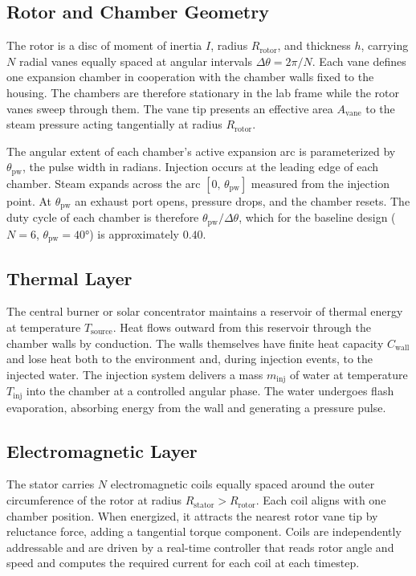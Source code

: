 \documentclass[11pt, a4paper]{article}
\theoremstyle{plain}
\theoremstyle{definition}
\newcommand{\Tsource}{T_{\mathrm{source}}}
\newcommand{\Tinject}{T_{\mathrm{inj}}}
\newcommand{\Nch}{N}
\begin{document}
\subsection{Rotor and Chamber Geometry}

The rotor is a disc of moment of inertia $I$, radius $R_{\mathrm{rotor}}$, and thickness $h$, carrying $\Nch$ radial vanes equally spaced at angular intervals $\Delta\theta = 2\pi / \Nch$. Each vane defines one expansion chamber in cooperation with the chamber walls fixed to the housing. The chambers are therefore stationary in the lab frame while the rotor vanes sweep through them. The vane tip presents an effective area $A_{\mathrm{vane}}$ to the steam pressure acting tangentially at radius $R_{\mathrm{rotor}}$.

The angular extent of each chamber's active expansion arc is parameterized by $\theta_{\mathrm{pw}}$, the pulse width in radians. Injection occurs at the leading edge of each chamber. Steam expands across the arc $[0,\, \theta_{\mathrm{pw}}]$ measured from the injection point. At $\theta_{\mathrm{pw}}$ an exhaust port opens, pressure drops, and the chamber resets. The duty cycle of each chamber is therefore $\theta_{\mathrm{pw}} / \Delta\theta$, which for the baseline design ($\Nch = 6$, $\theta_{\mathrm{pw}} = 40°$) is approximately $0.40$.

\subsection{Thermal Layer}

The central burner or solar concentrator maintains a reservoir of thermal energy at temperature $\Tsource$. Heat flows outward from this reservoir through the chamber walls by conduction. The walls themselves have finite heat capacity $C_{\mathrm{wall}}$ and lose heat both to the environment and, during injection events, to the injected water. The injection system delivers a mass $m_{\mathrm{inj}}$ of water at temperature $\Tinject$ into the chamber at a controlled angular phase. The water undergoes flash evaporation, absorbing energy from the wall and generating a pressure pulse.

\subsection{Electromagnetic Layer}

The stator carries $\Nch$ electromagnetic coils equally spaced around the outer circumference of the rotor at radius $R_{\mathrm{stator}} > R_{\mathrm{rotor}}$. Each coil aligns with one chamber position. When energized, it attracts the nearest rotor vane tip by reluctance force, adding a tangential torque component. Coils are independently addressable and are driven by a real-time controller that reads rotor angle and speed and computes the required current for each coil at each timestep.
\end{document}
